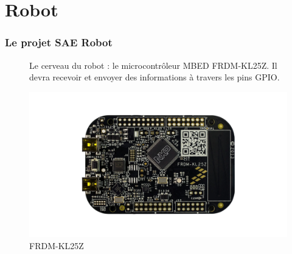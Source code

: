 \section{Robot}

\begin{frame}
    \frametitle{Le projet SAE Robot}

    
    \begin{figure}[H]
        \centering
        \begin{minipage}{.5\textwidth}
            \centering
            Le cerveau du robot : le microcontrôleur MBED FRDM-KL25Z. Il devra recevoir et envoyer des informations à travers les pins GPIO. 
        \end{minipage}%
        \begin{minipage}{.5\textwidth}
            \centering
            \includegraphics[width=.7\linewidth]{Images/frdmkl25z.png}
            \caption{FRDM-KL25Z}
            \label{fig:µC}
        \end{minipage}%
    \end{figure}
    
\vfill\footer{\hfill\insertframenumber/\inserttotalframenumber}
\end{frame}

